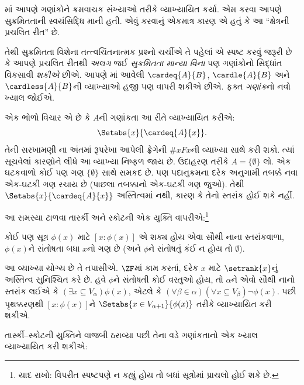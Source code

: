 \documentclass[../../../include/open-logic-section]{subfiles}
\begin{document}

માં આપણે
ગણાંકોને ક્રમવાચક સંખ્યાઓ તરીકે વ્યાખ્યાયિત કર્યા.
એમ કરવા આપણે સુક્રમિતતાની સ્વયંસિદ્ધિ માની હતી.
એવું કરવાનું એકમાત્ર કારણ એ હતું કે આ
``ક્ષેત્રની પ્રચલિત રીત'' છે.

તેથી સુક્રમિતતા વિશેના તત્ત્વચિંતનાત્મક પ્રશ્નો
ચર્ચીએ તે પહેલાં એ સ્પષ્ટ કરવું જરૂરી છે કે આપણે
પ્રચલિત રીતથી \emph{અલગ} જઈ \emph{સુક્રમિતતા
માન્યા વિના} પણ ગણાંકોનો સિદ્ધાંત વિકસાવી
\emph{શકીએ} છીએ. આપણે
માં આવેલી
$\cardeq{A}{B}$, $\cardle{A}{B}$ અને $\cardless{A}{B}$ની
વ્યાખ્યાઓ હજી પણ વાપરી શકીએ છીએ. ફક્ત
\emph{ગણાંક}નો નવો ખ્યાલ જોઈએ.

એક ભોળો વિચાર એ છે કે $A$ની ગણાંકતા આ રીતે
વ્યાખ્યાયિત કરીએ:
\[
	\Setabs{x}{\cardeq{A}{x}}.
\]
તેની સરખામણી ના
અંતમાં રૂપરેખા આપેલી ફ્રેગેની $\# x Fx$ની
વ્યાખ્યા સાથે કરી શકો. ત્યાં સૂચવેલાં કારણોને
લીધે આ વ્યાખ્યા નિષ્ફળ જાય છે. ઉદાહરણ તરીકે $A=\{\emptyset\}$ લો. એક ઘટકવાળો
કોઈ પણ ગણ $\{\emptyset\}$ સાથે સમકદ છે.
પણ પદાનુક્રમના દરેક અનુગામી તબક્કે નવા
એક-ઘટકી ગણ રચાય છે (પાછલા તબક્કાનો
એક-ઘટકી ગણ જુઓ). તેથી
$\Setabs{x}{\cardeq{A}{x}}$ અસ્તિત્વમાં નથી,
કારણ કે તેનો સ્તરાંક હોઈ શકે નહીં.

આ સમસ્યા ટાળવા તાર્સ્કી અને સ્કોટની એક
યુક્તિ વાપરીએ:\footnote{યાદ રાખો: વિપરીત
સ્પષ્ટપણે ન કહ્યું હોય તો બધાં સૂત્રોમાં
પ્રાચલો હોઈ શકે છે.}

\begin{defn}[તાર્સ્કી--સ્કોટ]
કોઈ પણ સૂત્ર $\phi(x)$ માટે $[ x : \phi(x)] $
એ શક્ય હોય એવા સૌથી નાના સ્તરાંકવાળા,
$\phi(x)$ને સંતોષતા બધા $x$નો ગણ છે
(અને $\phi$ને સંતોષતું કંઈ ન હોય તો $\emptyset$).
\end{defn}

આ વ્યાખ્યા યોગ્ય છે તે તપાસીએ. $\ZF$માં
કામ કરતાં,
દરેક $x$ માટે $\setrank{x}$નું અસ્તિત્વ
સુનિશ્ચિત કરે છે. હવે $\phi$ને સંતોષતી
કોઈ વસ્તુઓ હોય, તો $\alpha$ને એવો સૌથી
નાનો સ્તરાંક લઈએ કે
$(\exists x\subseteq V_\alpha)\phi(x)$,
એટલે કે $(\forall \beta \in \alpha)(\forall x
\subseteq V_\beta)\lnot \phi(x)$.
પછી પૃથક્કરણથી $[x : \phi(x)]$ને
$\Setabs{x \in V_{\alpha+1}}{\phi(x)}$
તરીકે વ્યાખ્યાયિત કરી શકીએ.

તાર્સ્કી--સ્કોટની યુક્તિને વાજબી ઠરાવ્યા
પછી તેના વડે ગણાંકતાનો એક ખ્યાલ
વ્યાખ્યાયિત કરી શકીએ:
\end{document}
